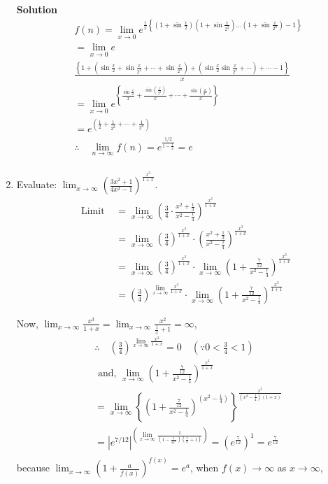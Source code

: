 \begin{enumerate}
\textbf{Solution}
$$
\begin{aligned}
& f(n)=\lim _{x \rightarrow 0} e^{\frac{1}{x}\left\{\left(1+\sin \frac{x}{2}\right)\left(1+\sin \frac{x}{2^2}\right) \ldots\left(1+\sin \frac{x}{2^n}\right)-1\right\}} \\
& =\lim _{x \rightarrow 0} e \\
& \frac{\left\{1+\left(\sin \frac{x}{2}+\sin \frac{x}{2^2}+\cdots+\sin \frac{x}{2^n}\right)+\left(\sin \frac{x}{2} \sin \frac{x}{2^2}+\cdots\right)+\cdots-1\right\}}{x} \\
& =\lim _{x \rightarrow 0} e^{\left\{\frac{\sin \frac{x}{2}}{x}+\frac{\sin \left(\frac{x}{2^2}\right)}{x}+\cdots+ \frac{\sin\left(\frac{x}{2^n}\right)}{x}\right\}} \\
& =e^{\left(\frac{1}{2}+\frac{1}{2^2}+\cdots+\frac{1}{2^n}\right)} \\
& \therefore \quad \lim _{n \rightarrow \infty} f(n)=e^{\frac{1 / 2}{1-\frac{1}{2}}}=e \\
&
\end{aligned}
$$
\item Evaluate: $\lim _{x \rightarrow \infty}\left(\frac{3 x^2+1}{4 x^2-1}\right)^{\frac{x^3}{1+x}}$.
$$
\begin{aligned}
\text { Limit } & =\lim _{x \rightarrow \infty}\left(\frac{3}{4} \cdot \frac{x^2+\frac{1}{3}}{x^2-\frac{1}{4}}\right)^{\frac{x^3}{1+x}} \\
& =\lim _{x \rightarrow \infty}\left(\frac{3}{4}\right)^{\frac{x^3}{1+x}} \cdot\left(\frac{x^2+\frac{1}{3}}{x^2-\frac{1}{4}}\right)^{\frac{x^3}{1+x}} \\
& =\lim _{x \rightarrow \infty}\left(\frac{3}{4}\right)^{\frac{x^3}{1+x}} \cdot \lim _{x \rightarrow \infty}\left(1+\frac{\frac{7}{12}}{x^2-\frac{1}{4}}\right)^{\frac{x^3}{1+x}} \\
& =\left(\frac{3}{4}\right)^{\lim _{x \rightarrow \infty} \frac{x^3}{1+x} } \cdot \lim _{x \rightarrow \infty}\left(1+\frac{\frac{7}{12}}{x^2-\frac{1}{4}}\right)^{\frac{x^3}{1+1}}
\end{aligned}
$$

Now, $\lim _{x \rightarrow \infty} \frac{x^3}{1+x}=\lim _{x \rightarrow \infty} \frac{x^2}{\frac{1}{x}+1}=\infty$,
$$
\begin{aligned}
& \therefore \quad\left(\frac{3}{4}\right)^{\lim _{x \rightarrow \infty} \frac{x^3}{1+x}}=0 \quad\left(\because 0<\frac{3}{4}<1\right) \\
& \text { and, } \lim _{x \rightarrow \infty}\left(1+\frac{\frac{7}{12}}{x^2-\frac{1}{4}}\right)^{\frac{x^3}{1+x}} \\
& =\lim _{x \rightarrow \infty}\left\{\left(1+\frac{\frac{7}{12}}{x^2-\frac{1}{4}}\right)^{(x^2-\frac{1}{4})}\right\}^{\frac{x^3}{\left(x^2-\frac{1}{4}\right)(1+x)}} \\
& =\left|e^{7 / 12}\right|^{\left(\lim _{x \rightarrow \infty} \frac{1}{\left(1-\frac{1}{4 x^2}\right)\left(\frac{1}{x}+1\right)}\right)}=\left(e^{\frac{7}{12}}\right)^1=e^{\frac{7}{12}} \\
&
\end{aligned}
$$
because $\lim _{x \rightarrow \infty}\left(1+\frac{a}{f(x)}\right)^{f(x)}=e^a$, when $f(x) \rightarrow \infty$ as $x \rightarrow \infty$,


\end{enumerate}
